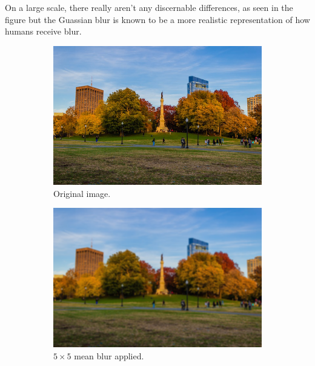 \documentclass{article}
\begin{document}
\begin{example}
    On a large scale, there really aren't any discernable differences, as seen in the figure but the Guassian blur is known to be a more realistic representation of how humans receive blur. 
    \begin{figure}[H]
      \centering
      \begin{subfigure}[b]{0.32\textwidth}
      \centering
          \includegraphics[width=\textwidth]{img/Park_Full.png}
          \caption{Original image. }
          \label{fig:Park_full}
      \end{subfigure}
      \begin{subfigure}[b]{0.32\textwidth}
      \centering
          \includegraphics[width=\textwidth]{img/Mean_Blur.png}
          \caption{$5 \times 5$ mean blur applied. }
          \label{fig:Mean_blur}
      \end{subfigure}
      \begin{subfigure}[b]{0.32\textwidth}

\end{subfigure}
\end{figure}
\end{example}
\end{document}

